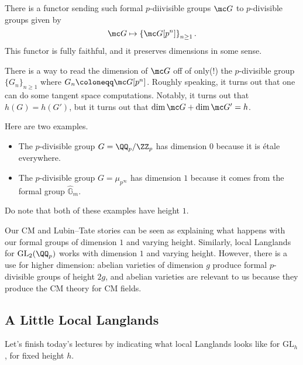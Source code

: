 \documentclass[../notes.tex]{subfiles}
\begin{document}
\begin{remark}
	There is a functor sending such formal $p$-diivisible groups $\mc G$ to $p$-divisible groups given by
	\[\mc G\mapsto\left\{\mc G[p^n]\right\}_{n\ge1}.\]
	This functor is fully faithful, and it preserves dimensions in some sense.
\end{remark}
\begin{remark}
	There is a way to read the dimension of $\mc G$ off of only(!) the $p$-divisible group $\{G_n\}_{n\ge1}$ where $G_n\coloneqq\mc G[p^n]$. Roughly speaking, it turns out that one can do some tangent space computations. Notably, it turns out that $h(G)=h(G')$, but it turns out that $\dim\mc G+\dim\mc G'=h$.
\end{remark}
\begin{example}
	Here are two examples.
	\begin{itemize}
		\item The $p$-divisible group $G=\QQ_p/\ZZ_p$ has dimension $0$ because it is \'etale everywhere.
		\item The $p$-divisible group $G=\mu_{p^\infty}$ has dimension $1$ because it comes from the formal group $\widehat{\mathbb G}_m$.
	\end{itemize}
	Do note that both of these examples have height $1$.
\end{example}
\begin{remark}
	Our CM and Lubin--Tate stories can be seen as explaining what happens with our formal groups of dimension $1$ and varying height. Similarly, local Langlands for $\mathrm{GL}_2(\QQ_p)$ works with dimension $1$ and varying height. However, there is a use for higher dimension: abelian varieties of dimension $g$ produce formal $p$-divisible groups of height $2g$, and abelian varieties are relevant to us because they produce the CM theory for CM fields.
\end{remark}

\subsection{A Little Local Langlands}
Let's finish today's lectures by indicating what local Langlands looks like for $\mathrm{GL}_h$, for fixed height $h$.
\end{document}
